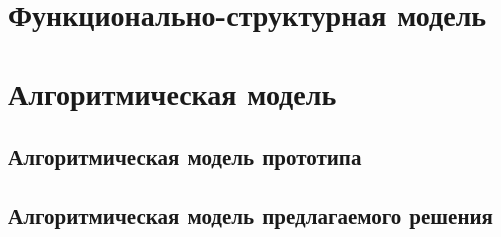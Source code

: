 \section{Функционально-структурная модель}

\section{Алгоритмическая модель}

\subsection{Алгоритмическая модель прототипа}

\subsection{Алгоритмическая модель предлагаемого решения}